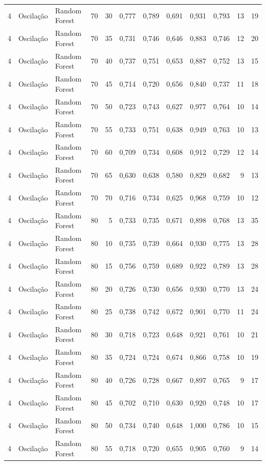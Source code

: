 \begin{longtable}{@{}rllrrrrrrrrr@{}}
4 & Oscilação & Random Forest & 70 & 30 & 0,777 & 0,789 & 0,691 & 0,931 & 0,793 & 13 & 19 \\
4 & Oscilação & Random Forest & 70 & 35 & 0,731 & 0,746 & 0,646 & 0,883 & 0,746 & 12 & 20 \\
4 & Oscilação & Random Forest & 70 & 40 & 0,737 & 0,751 & 0,653 & 0,887 & 0,752 & 13 & 15 \\
4 & Oscilação & Random Forest & 70 & 45 & 0,714 & 0,720 & 0,656 & 0,840 & 0,737 & 11 & 18 \\
4 & Oscilação & Random Forest & 70 & 50 & 0,723 & 0,743 & 0,627 & 0,977 & 0,764 & 10 & 14 \\
4 & Oscilação & Random Forest & 70 & 55 & 0,733 & 0,751 & 0,638 & 0,949 & 0,763 & 10 & 13 \\
4 & Oscilação & Random Forest & 70 & 60 & 0,709 & 0,734 & 0,608 & 0,912 & 0,729 & 12 & 14 \\
4 & Oscilação & Random Forest & 70 & 65 & 0,630 & 0,638 & 0,580 & 0,829 & 0,682 & 9 & 13 \\
4 & Oscilação & Random Forest & 70 & 70 & 0,716 & 0,734 & 0,625 & 0,968 & 0,759 & 10 & 12 \\
4 & Oscilação & Random Forest & 80 & 5 & 0,733 & 0,735 & 0,671 & 0,898 & 0,768 & 13 & 35 \\
4 & Oscilação & Random Forest & 80 & 10 & 0,735 & 0,739 & 0,664 & 0,930 & 0,775 & 13 & 28 \\
4 & Oscilação & Random Forest & 80 & 15 & 0,756 & 0,759 & 0,689 & 0,922 & 0,789 & 13 & 28 \\
4 & Oscilação & Random Forest & 80 & 20 & 0,726 & 0,730 & 0,656 & 0,930 & 0,770 & 13 & 24 \\
4 & Oscilação & Random Forest & 80 & 25 & 0,738 & 0,742 & 0,672 & 0,901 & 0,770 & 11 & 24 \\
4 & Oscilação & Random Forest & 80 & 30 & 0,718 & 0,723 & 0,648 & 0,921 & 0,761 & 10 & 21 \\
4 & Oscilação & Random Forest & 80 & 35 & 0,724 & 0,724 & 0,674 & 0,866 & 0,758 & 10 & 19 \\
4 & Oscilação & Random Forest & 80 & 40 & 0,726 & 0,728 & 0,667 & 0,897 & 0,765 & 9 & 17 \\
4 & Oscilação & Random Forest & 80 & 45 & 0,702 & 0,710 & 0,630 & 0,920 & 0,748 & 10 & 17 \\
4 & Oscilação & Random Forest & 80 & 50 & 0,734 & 0,740 & 0,648 & 1,000 & 0,786 & 10 & 15 \\
4 & Oscilação & Random Forest & 80 & 55 & 0,718 & 0,720 & 0,655 & 0,905 & 0,760 & 9 & 14 \\

\end{longtable}
